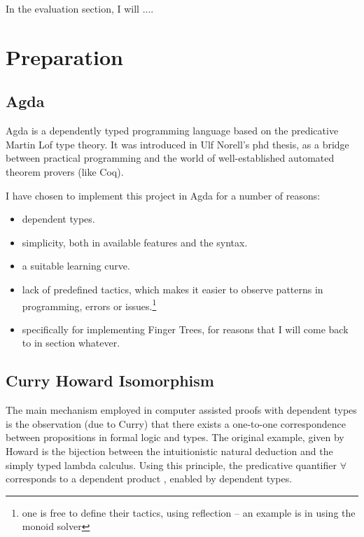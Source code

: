\documentclass[12pt,twoside,notitlepage]{report}
\begin{document}
In the evaluation section, I will ....
 
\chapter{Preparation}

\section{Agda}

Agda is a dependently typed programming language based on the predicative Martin Lof type theory. It was introduced in Ulf Norell’s phd thesis, as a bridge between practical programming and the world of well-established automated theorem provers (like Coq). 

I have chosen to implement this project in Agda for a number of reasons: 
\begin{itemize}

\item dependent types.
\item simplicity, both in available features and the syntax.
\item a suitable learning curve.
\item lack of predefined tactics, which makes it easier to observe patterns in programming, errors or issues.\footnote{one is free to define their tactics, using reflection  – an example is in using the monoid solver}
\item specifically for implementing Finger Trees, for reasons that I will come back to in section whatever.
\end{itemize}

\section{Curry Howard Isomorphism}

The main mechanism employed in computer assisted proofs with dependent types is the observation (due to Curry) that there exists a one-to-one correspondence between propositions in formal logic and types. The original example, given by Howard is the bijection between the intuitionistic natural deduction and the simply typed lambda calculus.
Using this principle, the predicative quantifier $\forall$ corresponds to a dependent product
\cite{hindely_milner} , enabled by dependent types.
\end{document}
